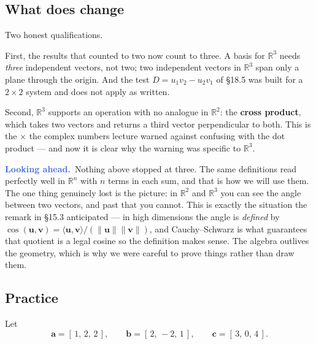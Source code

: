 \documentclass[11pt]{article}
\theoremstyle{definition}
\theoremstyle{remark}
\newcommand{\lookahead}{\par\smallskip\noindent
  \textbf{\sffamily\textcolor{RoyalBlue}{Looking ahead.}}\ \ignorespaces}
\newcommand{\R}{\mathbb{R}}
\newcommand{\vc}[1]{\mathbf{#1}}
\newcommand{\norm}[1]{\lVert #1\rVert}
\begin{document}
\subsection{What does change}
Two honest qualifications.

First, the results that counted to two now count to three. A basis for $\R^{3}$
needs \emph{three} independent vectors, not two; two independent vectors in
$\R^{3}$ span only a plane through the origin. And the test $D=u_1v_2-u_2v_1$ of
\S18.5 was built for a $2\times2$ system and does not apply as written.

Second, $\R^{3}$ supports an operation with no analogue in $\R^{2}$: the
\textbf{cross product}, which takes two vectors and returns a third vector
perpendicular to both. This is the $\times$ the complex numbers lecture warned
against confusing with the dot product --- and now it is clear why the warning
was specific to $\R^{3}$.

\lookahead Nothing above stopped at three. The same definitions read perfectly
well in $\R^{n}$ with $n$ terms in each sum, and that is how we will use them.
The one thing genuinely lost is the picture: in $\R^{2}$ and $\R^{3}$ you can see
the angle between two vectors, and past that you cannot. This is exactly the
situation the remark in \S15.3 anticipated --- in high dimensions the angle is
\emph{defined} by $\cos(\vc{u},\vc{v})=\langle\vc{u},\vc{v}\rangle/(\norm{\vc{u}}\norm{\vc{v}})$,
and Cauchy--Schwarz is what guarantees that quotient is a legal cosine so the
definition makes sense. The algebra outlives the geometry, which is why we were
careful to prove things rather than draw them.

\subsection{Practice}
Let
\[
  \vc{a} = [\,1,\,2,\,2\,],
  \qquad
  \vc{b} = [\,2,\,-2,\,1\,],
  \qquad
  \vc{c} = [\,3,\,0,\,4\,] .
\]
\end{document}
